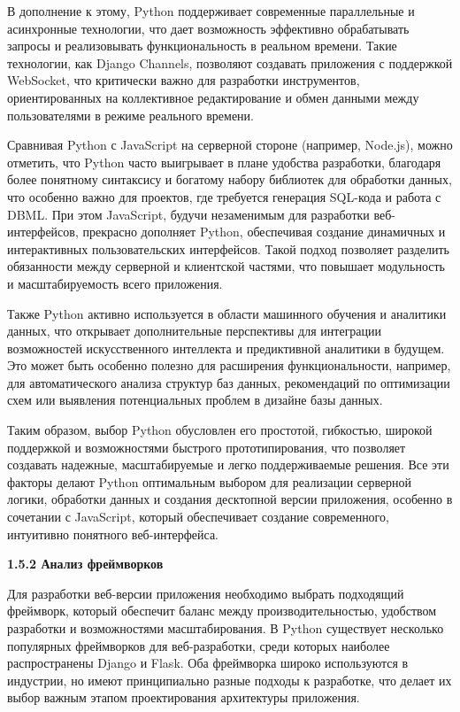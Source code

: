 В дополнение к этому, Python поддерживает современные параллельные и асинхронные технологии, что дает возможность эффективно обрабатывать запросы и реализовывать функциональность в реальном времени. Такие технологии, как Django Channels, позволяют создавать приложения с поддержкой WebSocket, что критически важно для разработки инструментов, ориентированных на коллективное редактирование и обмен данными между пользователями в режиме реального времени.

Сравнивая Python с JavaScript на серверной стороне (например, Node.js), можно отметить, что Python часто выигрывает в плане удобства разработки, благодаря более понятному синтаксису и богатому набору библиотек для обработки данных, что особенно важно для проектов, где требуется генерация SQL-кода и работа с DBML. При этом JavaScript, будучи незаменимым для разработки веб-интерфейсов, прекрасно дополняет Python, обеспечивая создание динамичных и интерактивных пользовательских интерфейсов. Такой подход позволяет разделить обязанности между серверной и клиентской частями, что повышает модульность и масштабируемость всего приложения.

Также Python активно используется в области машинного обучения и аналитики данных, что открывает дополнительные перспективы для интеграции возможностей искусственного интеллекта и предиктивной аналитики в будущем. Это может быть особенно полезно для расширения функциональности, например, для автоматического анализа структур баз данных, рекомендаций по оптимизации схем или выявления потенциальных проблем в дизайне базы данных.

Таким образом, выбор Python обусловлен его простотой, гибкостью, широкой поддержкой и возможностями быстрого прототипирования, что позволяет создавать надежные, масштабируемые и легко поддерживаемые решения. Все эти факторы делают Python оптимальным выбором для реализации серверной логики, обработки данных и создания десктопной версии приложения, особенно в сочетании с JavaScript, который обеспечивает создание современного, интуитивно понятного веб-интерфейса.

\textbf{\large 1.5.2 Анализ фреймворков}

Для разработки веб-версии приложения необходимо выбрать подходящий фреймворк, который обеспечит баланс между производительностью, удобством разработки и возможностями масштабирования. В Python существует несколько популярных фреймворков для веб-разработки, среди которых наиболее распространены Django и Flask. Оба фреймворка широко используются в индустрии, но имеют принципиально разные подходы к разработке, что делает их выбор важным этапом проектирования архитектуры приложения.

